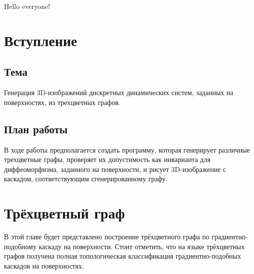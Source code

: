 


	\textsf{Hello everyone!}
	\section*{Вступление}
	\subsection*{Тема}
	Генерация 3D-изображений дискретных динамических систем, заданных на поверхностях, из трехцветных графов.
	\subsection*{План работы}
	В ходе работы предполагается создать программу, которая генерирует различные трехцветные графы, проверяет их допустимость как инварианта для диффеоморфизма, заданного на поверхности, и рисует 3D-изображение с каскадом, соответствующим сгенерированному графу.
	\section*{Трёхцветный граф}
	В этой главе будет представлено построение трёхцветного графа по градиентно-подобному каскаду на поверхности. Стоит отметить, что на языке трёхцветных графов получена полная топологическая классификация градиентно-подобных каскадов на поверхностях.
